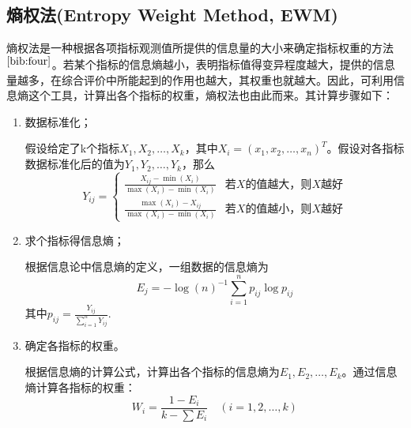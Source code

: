 \documentclass[bwprint]{cumcmthesis}
\begin{document}
        \subsection{熵权法(Entropy Weight Method, EWM)}
        熵权法是一种根据各项指标观测值所提供的信息量的大小来确定指标权重的方法$^{\cite{bib:four}}$。若某个指标的信息熵越小，表明指标值得变异程度越大，提供的信息量越多，在综合评价中所能起到的作用也越大，其权重也就越大。因此，可利用信息熵这个工具，计算出各个指标的权重，熵权法也由此而来。其计算步骤如下：
        \begin{enumerate}
            \item 数据标准化；
            
            假设给定了k个指标$X_1,X_2,\dots,X_k$，其中$X_i = ({x_1,x_2,\dots,x_n})^T$。假设对各指标数据标准化后的值为$Y_1,Y_2,\dots,Y_k$，那么
            \[
                Y_{ij}=
            \begin{cases}
                \label{eq:EWM1}
                \frac{X_{ij}-\min(X_i)}{\max(X_i)-\min(X_i)}  & \text{若}X\text{的值越大，则}X\text{越好} \\
                \frac{\max(X_i)-X_{ij}}{\max(X_i)-\min(X_i)}  &\text{若}X\text{的值越小，则}X\text{越好}  
            \end{cases}
            \]

            \item 求个指标得信息熵；
            
            根据信息论中信息熵的定义，一组数据的信息熵为
            \begin{equation}
                \label{eq:EWM2}
                E_j = -\log(n)^{-1}\sum_{i=1}^{n}p_{ij}\log p_{ij}
            \end{equation}
            其中$p_{ij} = \frac{Y_{ij}}{\sum_{i=1}^{n}Y_{ij}}$.
            \item 确定各指标的权重。
            
            根据信息熵的计算公式，计算出各个指标的信息熵为$E_1,E_2,\dots,E_k$。通过信息熵计算各指标的权重：
            \begin{equation}
                \label{eq:EWM3}
                W_i = \frac{1-E_i}{k-\sum E_i}\quad (i = 1,2,\dots,k)
            \end{equation}
        \end{enumerate}
        
\end{document}
